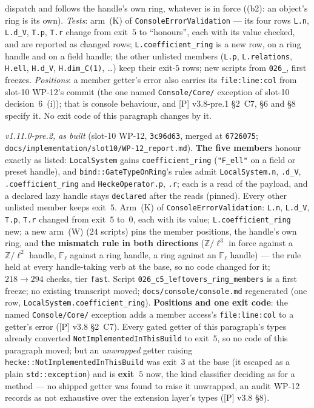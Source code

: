 \documentclass[11pt]{article}
\theoremstyle{remark}
\newcommand{\F}{\mathbb{F}}
\newcommand{\Z}{\mathbb{Z}}
\newcommand{\Fl}{\F_\ell}
\begin{document}
dispatch and follows the handle's own ring, whatever is in force ((b2): an object's ring is its
own). \emph{Tests}: arm~(K) of \texttt{ConsoleErrorValidation} --- its four rows \texttt{L.n},
\texttt{L.d\_V}, \texttt{T.p}, \texttt{T.r} change from exit~$5$ to ``honours'', each with its
value checked, and are reported as changed rows; \texttt{L.coefficient\_ring} is a new row, on a
ring handle and on a field handle; the other unlisted members (\texttt{L.p}, \texttt{L.relations},
\texttt{H.ell}, \texttt{H.d\_V}, \texttt{H.dim\_C(1)}, \ldots) keep their exit-$5$ rows; new scripts from \texttt{026\_}, first freezes. \emph{Positions}:
a member getter's error also carries its \texttt{file:line:col} from slot-10 WP-12's commit (the one
named \texttt{Console/Core/} exception of slot-10 decision~6~(i)); that is console behaviour, and
[P] v3.8-pre.1 \S2~C7, \S6 and \S8 specify it. No exit code of this paragraph changes by it.

\emph{v1.11.0-pre.2, as built} (slot-10 WP-12, \texttt{3c96d63}, merged at \texttt{6726075};
\texttt{docs/implementation/slot10/WP-12\_report.md}). \textbf{The five members} honour exactly as
listed: \texttt{LocalSystem} gains \texttt{coefficient\_ring} (\texttt{"F\_ell"} on a field or
preset handle), and \texttt{bind::GateTypeOnRing}'s rules admit \texttt{LocalSystem.n}, \texttt{.d\_V},
\texttt{.coefficient\_ring} and \texttt{HeckeOperator.p}, \texttt{.r}; each is a read of the payload,
and a declared lazy handle stays \texttt{declared} after the reads (pinned). Every other unlisted
member keeps exit~$5$. Arm~(K) of \texttt{ConsoleErrorValidation}: \texttt{L.n}, \texttt{L.d\_V},
\texttt{T.p}, \texttt{T.r} changed from exit~$5$ to~$0$, each with its value; \texttt{L.coefficient\_ring}
new; a new arm~(W) ($24$ scripts) pins the member positions, the handle's own ring, and \textbf{the
mismatch rule in both directions} ($\Z/\ell^3$ in force against a $\Z/\ell^2$ handle, $\Fl$ against a
ring handle, a ring against an $\Fl$ handle) --- the rule held at every handle-taking verb at the base,
so no code changed for it; $218\to294$ checks, tier \texttt{fast}. Script \texttt{026\_c5\_leftovers\_ring\_members}
is a first freeze; no existing transcript moved; \texttt{docs/console/console.md} regenerated (one
row, \texttt{LocalSystem.coefficient\_ring}). \textbf{Positions and one exit code}: the named
\texttt{Console/Core/} exception adds a member access's \texttt{file:line:col} to a getter's error
([P] v3.8 \S2~C7). Every gated getter of this paragraph's types already converted
\texttt{NotImplementedInThisBuild} to exit~$5$, so no code of this paragraph moved; but an
\emph{unwrapped} getter raising \texttt{hecke::NotImplementedInThisBuild} was exit~$3$ at the base
(it escaped as a plain \texttt{std::exception}) and is \textbf{exit~$5$} now, the kind classifier
deciding as for a method --- no shipped getter was found to raise it unwrapped, an audit WP-12
records as not exhaustive over the extension layer's types ([P] v3.8 \S8).\par
\endgroup
\end{document}
